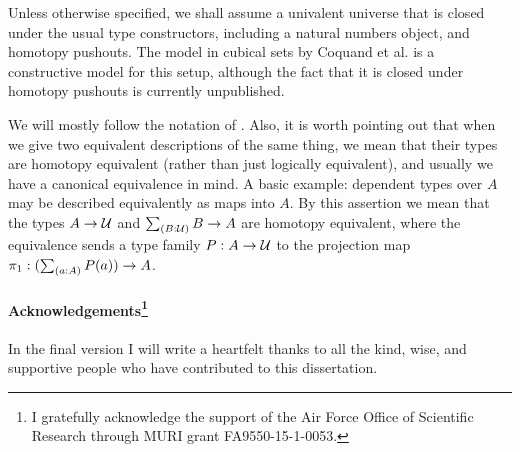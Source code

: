 Unless otherwise specified, we shall assume a univalent universe that is closed
under the usual type constructors, including a natural numbers object, and
homotopy pushouts. The model in cubical sets by Coquand et al. \cite{BezemCoquandHuber} is a
constructive model for this setup, although the fact that it is closed under
homotopy pushouts is currently unpublished.

We will mostly follow the notation of \cite{hottbook}.
Also, it is worth pointing out that when we give two equivalent descriptions
of the same thing, we mean that their types are homotopy equivalent
(rather than just logically equivalent), and usually
we have a canonical equivalence in mind. A basic
example: dependent types over $A$ may be described equivalently as maps into
$A$. By this assertion we mean that the types $A\to\mathcal{U}$ and $\sm{B:\UU}B\to A$ are 
homotopy equivalent, where the equivalence sends a type family $P:A\to\mathcal{U}$ to the projection map
$\pi_1:(\sm{a:A}P(a))\to A$.

\paragraph{Acknowledgements\footnote{I gratefully acknowledge the support of the Air Force Office of Scientific Research through MURI grant FA9550-15-1-0053.}}
In the final version I will write a heartfelt thanks to all the kind, wise, and supportive people who have contributed to this dissertation.

